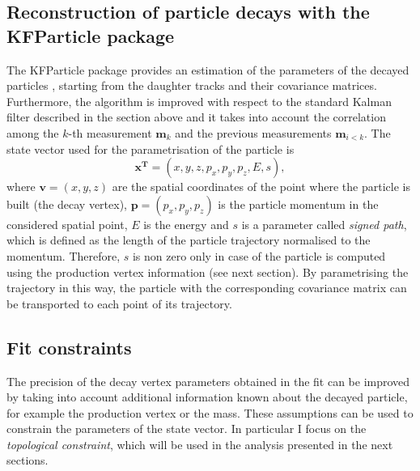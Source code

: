 \documentclass[b5paper,10pt,twoside,oldstyle,classica]{toptesi}
\begin{document}
\subsection{Reconstruction of particle decays with the KFParticle package}
\label{KFParticle_sec}
The KFParticle package provides an estimation of the parameters of the decayed particles \cite{Kisel:2006}, starting from the daughter tracks and their covariance matrices. Furthermore, the algorithm is improved with respect to the standard Kalman filter described in the section above and it takes into account the correlation among the $k$-th measurement $\pmb{m}_k$ and the previous measurements $\pmb{m}_{i<k}$. The state vector used for the parametrisation of the particle is 
\begin{equation}
 \pmb{x^T} = (x,y,z,p_x,p_y,p_z,E,s),
 \label{statevectorKF}
\end{equation}
where $\pmb{v} = (x,y,z)$ are the spatial coordinates of the point where the particle is built (the decay vertex), $\pmb{p} = (p_x,p_y,p_z)$ is the particle momentum in the considered spatial point, $E$ is the energy and $s$ is a parameter called \textit{signed path}, which is defined as the length of the particle trajectory normalised to the momentum. Therefore, $s$ is non zero only in case of the particle is computed using the production vertex information (see next section). By parametrising the trajectory in this way, the particle with the corresponding covariance matrix can be transported to each point of its trajectory. 
\subsection{Fit constraints}
The precision of the decay vertex parameters obtained in the fit can be improved by taking into account additional information known about the decayed particle, for example the production vertex or the mass. These assumptions can be used to constrain the parameters of the state vector. In particular I focus on the \textit{topological constraint}, which will be used in the analysis presented in the next sections.
\end{document}

